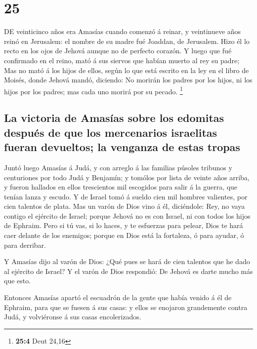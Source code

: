 \hypertarget{section-24}{%
\section{25}\label{section-24}}

 DE veinticinco años era Amasías cuando comenzó á reinar,
y veintinueve años reinó en Jerusalem: el nombre de su madre fué
Joaddan, de Jerusalem.  Hizo él lo recto en los ojos de
Jehová aunque no de perfecto corazón.  Y luego que fué
confirmado en el reino, mató á sus siervos que habían muerto al rey su
padre;  Mas no mató á los hijos de ellos, según lo que
está escrito en la ley en el libro de Moisés, donde Jehová mandó,
diciendo: No morirán los padres por los hijos, ni los hijos por los
padres; mas cada uno morirá por su pecado. \footnote{\textbf{25:4} Deut
  24,16}

\hypertarget{la-victoria-de-amasuxedas-sobre-los-edomitas-despuuxe9s-de-que-los-mercenarios-israelitas-fueran-devueltos-la-venganza-de-estas-tropas}{%
\subsection{La victoria de Amasías sobre los edomitas después de que los
mercenarios israelitas fueran devueltos; la venganza de estas
tropas}\label{la-victoria-de-amasuxedas-sobre-los-edomitas-despuuxe9s-de-que-los-mercenarios-israelitas-fueran-devueltos-la-venganza-de-estas-tropas}}

 Juntó luego Amasías á Judá, y con arreglo á las familias
púsoles tribunos y centuriones por todo Judá y Benjamín; y tomólos por
lista de veinte años arriba, y fueron hallados en ellos trescientos mil
escogidos para salir á la guerra, que tenían lanza y escudo.
 Y de Israel tomó á sueldo cien mil hombres valientes, por
cien talentos de plata.  Mas un varón de Dios vino á él,
diciéndole: Rey, no vaya contigo el ejército de Israel; porque Jehová no
es con Israel, ni con todos los hijos de Ephraim.  Pero si
tú vas, si lo haces, y te esfuerzas para pelear, Dios te hará caer
delante de los enemigos; porque en Dios está la fortaleza, ó para
ayudar, ó para derribar.

 Y Amasías dijo al varón de Dios: ¿Qué pues se hará de
cien talentos que he dado al ejército de Israel? Y el varón de Dios
respondió: De Jehová es darte mucho más que esto.

 Entonces Amasías apartó el escuadrón de la gente que
había venido á él de Ephraim, para que se fuesen á sus casas: y ellos se
enojaron grandemente contra Judá, y volviéronse á sus casas
encolerizados.

